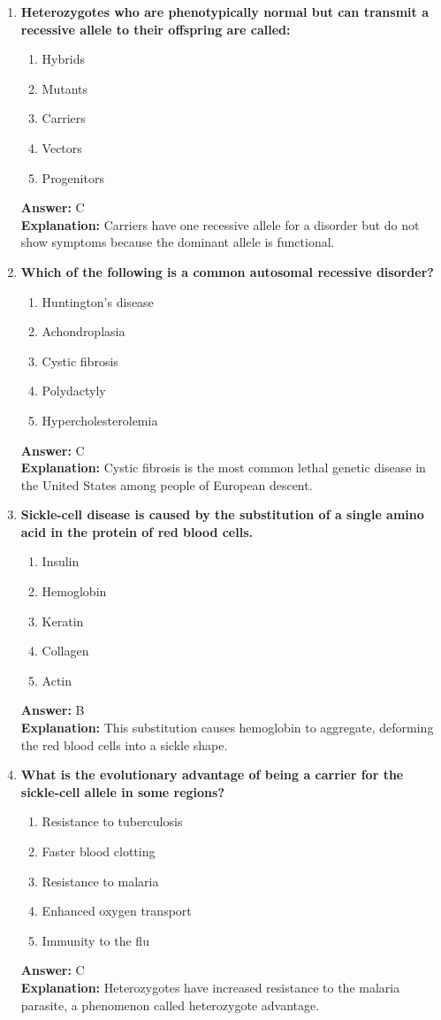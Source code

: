 \documentclass[11pt, a4paper]{article}
\begin{document}
\begin{enumerate}[leftmargin=*, label=\arabic*.]
\item \textbf{Heterozygotes who are phenotypically normal but can transmit a recessive allele to their offspring are called:}
\begin{enumerate}[label=\Alph*.]
\item Hybrids
\item Mutants
\item Carriers
\item Vectors
\item Progenitors
\end{enumerate}
\textbf{Answer:} C \\
\textbf{Explanation:} Carriers have one recessive allele for a disorder but do not show symptoms because the dominant allele is functional.

\item \textbf{Which of the following is a common autosomal recessive disorder?}
\begin{enumerate}[label=\Alph*.]
\item Huntington's disease
\item Achondroplasia
\item Cystic fibrosis
\item Polydactyly
\item Hypercholesterolemia
\end{enumerate}
\textbf{Answer:} C \\
\textbf{Explanation:} Cystic fibrosis is the most common lethal genetic disease in the United States among people of European descent.

\item \textbf{Sickle-cell disease is caused by the substitution of a single amino acid in the \underline{\hspace{1cm}} protein of red blood cells.}
\begin{enumerate}[label=\Alph*.]
\item Insulin
\item Hemoglobin
\item Keratin
\item Collagen
\item Actin
\end{enumerate}
\textbf{Answer:} B \\
\textbf{Explanation:} This substitution causes hemoglobin to aggregate, deforming the red blood cells into a sickle shape.

\item \textbf{What is the evolutionary advantage of being a carrier for the sickle-cell allele in some regions?}
\begin{enumerate}[label=\Alph*.]
\item Resistance to tuberculosis
\item Faster blood clotting
\item Resistance to malaria
\item Enhanced oxygen transport
\item Immunity to the flu
\end{enumerate}
\textbf{Answer:} C \\
\textbf{Explanation:} Heterozygotes have increased resistance to the malaria parasite, a phenomenon called heterozygote advantage.


\end{enumerate}
\end{document}
